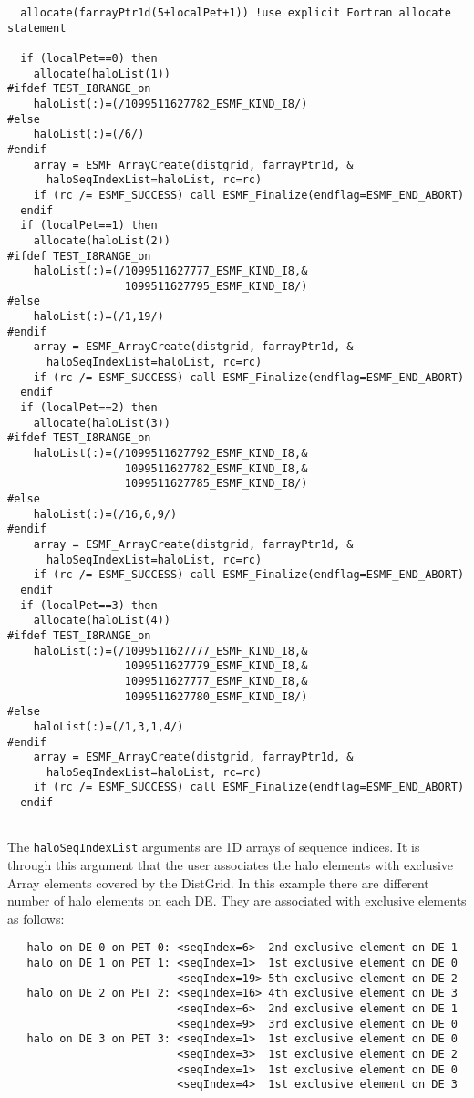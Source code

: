  \begin{verbatim}
  allocate(farrayPtr1d(5+localPet+1)) !use explicit Fortran allocate statement
  
  if (localPet==0) then
    allocate(haloList(1))
#ifdef TEST_I8RANGE_on
    haloList(:)=(/1099511627782_ESMF_KIND_I8/)
#else    
    haloList(:)=(/6/)
#endif
    array = ESMF_ArrayCreate(distgrid, farrayPtr1d, &
      haloSeqIndexList=haloList, rc=rc)
    if (rc /= ESMF_SUCCESS) call ESMF_Finalize(endflag=ESMF_END_ABORT)
  endif
  if (localPet==1) then
    allocate(haloList(2))
#ifdef TEST_I8RANGE_on
    haloList(:)=(/1099511627777_ESMF_KIND_I8,&
                  1099511627795_ESMF_KIND_I8/)
#else
    haloList(:)=(/1,19/)
#endif
    array = ESMF_ArrayCreate(distgrid, farrayPtr1d, &
      haloSeqIndexList=haloList, rc=rc)
    if (rc /= ESMF_SUCCESS) call ESMF_Finalize(endflag=ESMF_END_ABORT)
  endif
  if (localPet==2) then
    allocate(haloList(3))
#ifdef TEST_I8RANGE_on
    haloList(:)=(/1099511627792_ESMF_KIND_I8,&
                  1099511627782_ESMF_KIND_I8,&
                  1099511627785_ESMF_KIND_I8/)
#else
    haloList(:)=(/16,6,9/)
#endif
    array = ESMF_ArrayCreate(distgrid, farrayPtr1d, &
      haloSeqIndexList=haloList, rc=rc)
    if (rc /= ESMF_SUCCESS) call ESMF_Finalize(endflag=ESMF_END_ABORT)
  endif
  if (localPet==3) then
    allocate(haloList(4))
#ifdef TEST_I8RANGE_on
    haloList(:)=(/1099511627777_ESMF_KIND_I8,&
                  1099511627779_ESMF_KIND_I8,&
                  1099511627777_ESMF_KIND_I8,&
                  1099511627780_ESMF_KIND_I8/)
#else
    haloList(:)=(/1,3,1,4/)
#endif
    array = ESMF_ArrayCreate(distgrid, farrayPtr1d, &
      haloSeqIndexList=haloList, rc=rc)
    if (rc /= ESMF_SUCCESS) call ESMF_Finalize(endflag=ESMF_END_ABORT)
  endif
 
\end{verbatim}
 

   The {\tt haloSeqIndexList} arguments are 1D arrays of sequence indices.
   It is through this argument that the user associates the halo elements with
   exclusive Array elements covered by the DistGrid. In this example there
   are different number of halo elements on each DE. They are associated
   with exclusive elements as follows:
  
   \begin{verbatim}
   halo on DE 0 on PET 0: <seqIndex=6>  2nd exclusive element on DE 1
   halo on DE 1 on PET 1: <seqIndex=1>  1st exclusive element on DE 0
                          <seqIndex=19> 5th exclusive element on DE 2
   halo on DE 2 on PET 2: <seqIndex=16> 4th exclusive element on DE 3
                          <seqIndex=6>  2nd exclusive element on DE 1
                          <seqIndex=9>  3rd exclusive element on DE 0
   halo on DE 3 on PET 3: <seqIndex=1>  1st exclusive element on DE 0
                          <seqIndex=3>  1st exclusive element on DE 2
                          <seqIndex=1>  1st exclusive element on DE 0
                          <seqIndex=4>  1st exclusive element on DE 3
   \end{verbatim}
  
